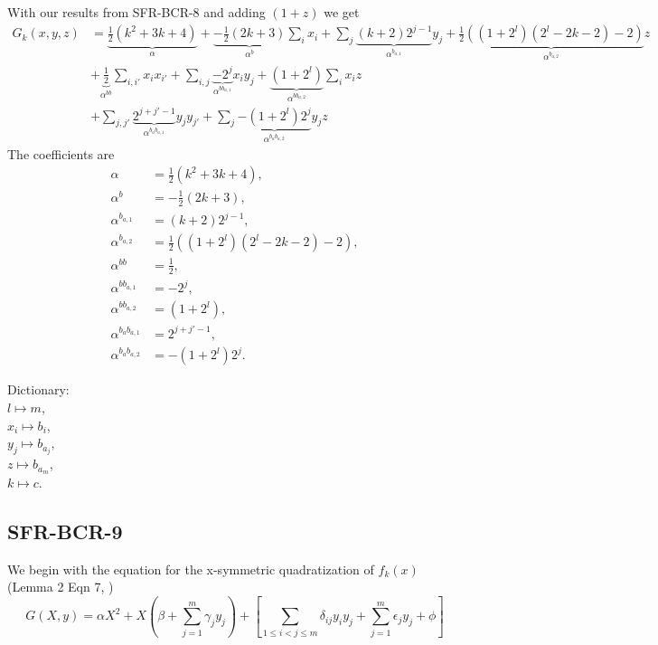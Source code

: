\documentclass[a4paper,english,notitlepage,longbibliography,showpacs,preprintnumbers,amsmath,amssymb,aps,prx,nofootinbib,12pt,superscriptaddress]{revtex4-1}
\begin{document}
\noindent With our results from SFR-BCR-8 and adding $(1+z)$ we get\\
\small
\begin{equation}
\begin{split}
  \left.
  G_k(x,y,z)
  \right.
  &=\underbrace{\frac{1}{2}(k^2+3k+4)}_{\alpha}
  + \underbrace{-\frac{1}{2}(2k+3)}_{\alpha^{b}} \sum_i x_i
  + \sum_j \underbrace{(k+2)2^{j-1}}_{\alpha^{b_{a,1}}}y_j
  + \underbrace{\frac{1}{2}((1+2^l)(2^l-2k-2)-2)}_{\alpha^{b_{a,2}}}z \\
  &+ \underbrace{\frac{1}{2}}_{\alpha^{bb}} \sum_{i,i'} x_ix_{i'}
  + \sum_{i,j} \underbrace{-2^{j}}_{\alpha^{bb_{a,1}}}x_iy_j
  + \underbrace{(1+2^l)}_{\alpha^{bb_{a,2}}}\sum_i x_iz \\
  &+ \sum_{j,j'} \underbrace{2^{j+j'-1}}_{\alpha^{b_ab_{a,1}}}y_jy_{j'}
  + \sum_j \underbrace{-(1+2^l)2^{j}}_{\alpha^{b_ab_{a,2}}} y_j z
\end{split}
\end{equation}
\normalsize
The coefficients are
\begin{subequations}
\begin{align}
\alpha &= \frac{1}{2}(k^2+3k+4), \\
%
\alpha^{b} &= -\frac{1}{2}(2k+3), \\
\alpha^{b_{a,1}} &= (k+2)2^{j-1}, \\
\alpha^{b_{a,2}} &= \frac{1}{2}((1+2^l)(2^l-2k-2)-2), \\
%
\alpha^{bb} &= \frac{1}{2}, \\
\alpha^{bb_{a,1}} &= -2^{j}, \\
\alpha^{bb_{a,2}} &= (1+2^l), \\
\alpha^{b_ab_{a,1}} &= 2^{j+j'-1}, \\
\alpha^{b_ab_{a,2}} &= -(1+2^l)2^{j}.
\end{align}
\end{subequations}

Dictionary: \\
$l\mapsto m$,\\
$x_i\mapsto b_i$, \\
$y_j\mapsto b_{a_j}$,\\
$z\mapsto b_{a_m}$,\\
$k\mapsto c$.

\subsection{SFR-BCR-9}

\noindent We begin with the equation for the x-symmetric quadratization of $f_k(x)$
\\(Lemma 2 Eqn 7, \cite{Boros2018QuadratizationsOS})
\begin{equation}
  G(X,y) = \alpha X^2 + X\left(\beta + \sum_{j=1}^m \gamma_jy_j\right) + \left[\sum_{1\leq i < j \leq m} \delta_{ij}y_iy_j + \sum_{j=1}^m \epsilon_jy_j+\phi\right]
\end{equation}
\end{document}
